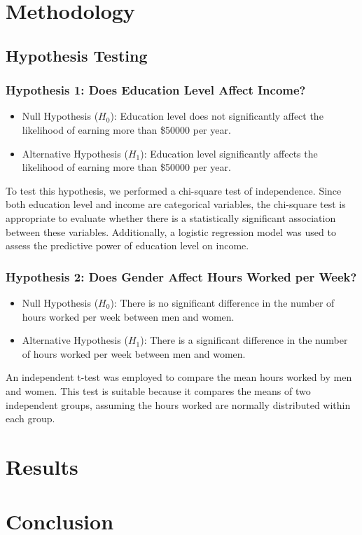\documentclass[conference]{IEEEtran}
\begin{document}
\section{Methodology}
\subsection{Hypothesis Testing}
\subsubsection{Hypothesis 1: Does Education Level Affect Income?}

\begin{itemize}
\item Null Hypothesis ($H_0$): Education level does not significantly affect the likelihood of earning more than \$50000 per year.
\item Alternative Hypothesis ($H_1$): Education level significantly affects the likelihood of earning more than \$50000 per year.
\end{itemize}

To test this hypothesis, we performed a chi-square test of independence. 
Since both education level and income are categorical variables, the chi-square test is appropriate to evaluate whether there is a statistically significant association between these variables. 
Additionally, a logistic regression model was used to assess the predictive power of education level on income.


\subsubsection{Hypothesis 2: Does Gender Affect Hours Worked per Week?}

\begin{itemize}
\item Null Hypothesis ($H_0$): There is no significant difference in the number of hours worked per week between men and women.
\item Alternative Hypothesis ($H_1$): There is a significant difference in the number of hours worked per week between men and women.
\end{itemize}



An independent t-test was employed to compare the mean hours worked by men and women. 
This test is suitable because it compares the means of two independent groups, assuming the hours worked are normally distributed within each group.
\section{Results}




\section{Conclusion}



\end{document}
